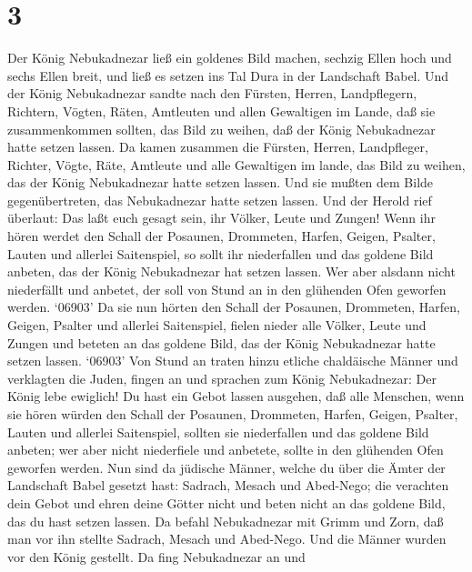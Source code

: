 \hypertarget{section-2}{%
\section{3}\label{section-2}}

 Der König Nebukadnezar ließ ein goldenes Bild machen,
sechzig Ellen hoch und sechs Ellen breit, und ließ es setzen ins Tal
Dura in der Landschaft Babel.  Und der König Nebukadnezar
sandte nach den Fürsten, Herren, Landpflegern, Richtern, Vögten, Räten,
Amtleuten und allen Gewaltigen im Lande, daß sie zusammenkommen sollten,
das Bild zu weihen, daß der König Nebukadnezar hatte setzen lassen.
 Da kamen zusammen die Fürsten, Herren, Landpfleger,
Richter, Vögte, Räte, Amtleute und alle Gewaltigen im lande, das Bild zu
weihen, das der König Nebukadnezar hatte setzen lassen. Und sie mußten
dem Bilde gegenübertreten, das Nebukadnezar hatte setzen lassen.
 Und der Herold rief überlaut: Das laßt euch gesagt sein,
ihr Völker, Leute und Zungen!  Wenn ihr hören werdet den
Schall der Posaunen, Drommeten, Harfen, Geigen, Psalter, Lauten und
allerlei Saitenspiel, so sollt ihr niederfallen und das goldene Bild
anbeten, das der König Nebukadnezar hat setzen lassen.  Wer
aber alsdann nicht niederfällt und anbetet, der soll von Stund an in den
glühenden Ofen geworfen werden.  `06903' Da sie nun hörten
den Schall der Posaunen, Drommeten, Harfen, Geigen, Psalter und allerlei
Saitenspiel, fielen nieder alle Völker, Leute und Zungen und beteten an
das goldene Bild, das der König Nebukadnezar hatte setzen lassen.
 `06903' Von Stund an traten hinzu etliche chaldäische
Männer und verklagten die Juden,  fingen an und sprachen zum
König Nebukadnezar: Der König lebe ewiglich!  Du hast ein
Gebot lassen ausgehen, daß alle Menschen, wenn sie hören würden den
Schall der Posaunen, Drommeten, Harfen, Geigen, Psalter, Lauten und
allerlei Saitenspiel, sollten sie niederfallen und das goldene Bild
anbeten;  wer aber nicht niederfiele und anbetete, sollte
in den glühenden Ofen geworfen werden.  Nun sind da
jüdische Männer, welche du über die Ämter der Landschaft Babel gesetzt
hast: Sadrach, Mesach und Abed-Nego; die verachten dein Gebot und ehren
deine Götter nicht und beten nicht an das goldene Bild, das du hast
setzen lassen.  Da befahl Nebukadnezar mit Grimm und Zorn,
daß man vor ihn stellte Sadrach, Mesach und Abed-Nego. Und die Männer
wurden vor den König gestellt.  Da fing Nebukadnezar an und
